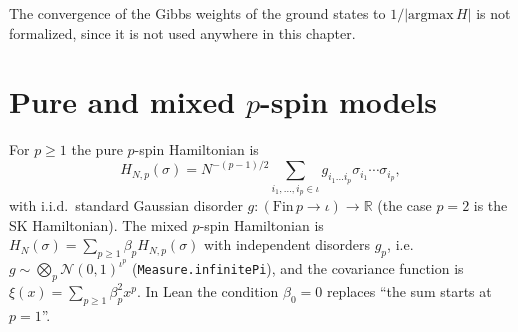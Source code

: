 \begin{remark}
The convergence of the Gibbs weights of the ground states to $1/|\mathrm{argmax}\,H|$ is not formalized, since it
is not used anywhere in this chapter.
\end{remark}

\section{Pure and mixed $p$-spin models}\label{sec:sg:pspin}

For $p\ge1$ the pure $p$-spin Hamiltonian is
\[H_{N,p}(\sigma)=N^{-(p-1)/2}\sum_{i_1,\dots,i_p\in\iota}g_{i_1\dots i_p}\sigma_{i_1}\cdots\sigma_{i_p},\]
with i.i.d.\ standard Gaussian disorder $g:(\mathrm{Fin}\,p\to\iota)\to\mathbb R$ (the case $p=2$ is the SK
Hamiltonian). The mixed $p$-spin Hamiltonian is $H_N(\sigma)=\sum_{p\ge1}\beta_pH_{N,p}(\sigma)$ with independent
disorders $g_p$, i.e.\ $g\sim\bigotimes_p\mathcal N(0,1)^{\iota^p}$ (\texttt{Measure.infinitePi}), and the covariance
function is $\xi(x)=\sum_{p\ge1}\beta_p^2x^p$. In Lean the condition $\beta_0=0$ replaces ``the sum starts at $p=1$''.

